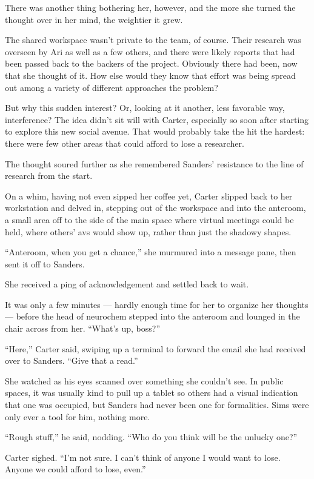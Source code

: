 There was another thing bothering her, however, and the more she turned the thought over in her mind, the weightier it grew.

The shared workspace wasn't private to the team, of course. Their research was overseen by Ari as well as a few others, and there were likely reports that had been passed back to the backers of the project. Obviously there had been, now that she thought of it. How else would they know that effort was being spread out among a variety of different approaches the problem?

But why this sudden interest? Or, looking at it another, less favorable way, interference? The idea didn't sit will with Carter, especially so soon after starting to explore this new social avenue. That would probably take the hit the hardest: there were few other areas that could afford to lose a researcher.

The thought soured further as she remembered Sanders' resistance to the line of research from the start.

On a whim, having not even sipped her coffee yet, Carter slipped back to her workstation and delved in, stepping out of the workspace and into the anteroom, a small area off to the side of the main space where virtual meetings could be held, where others' avs would show up, rather than just the shadowy shapes.

``Anteroom, when you get a chance,'' she murmured into a message pane, then sent it off to Sanders.

She received a ping of acknowledgement and settled back to wait.

It was only a few minutes — hardly enough time for her to organize her thoughts — before the head of neurochem stepped into the anteroom and lounged in the chair across from her. ``What's up, boss?''

``Here,'' Carter said, swiping up a terminal to forward the email she had received over to Sanders. ``Give that a read.''

She watched as his eyes scanned over something she couldn't see. In public spaces, it was usually kind to pull up a tablet so others had a visual indication that one was occupied, but Sanders had never been one for formalities. Sims were only ever a tool for him, nothing more.

``Rough stuff,'' he said, nodding. ``Who do you think will be the unlucky one?''

Carter sighed. ``I'm not sure. I can't think of anyone I would want to lose. Anyone we could afford to lose, even.''

